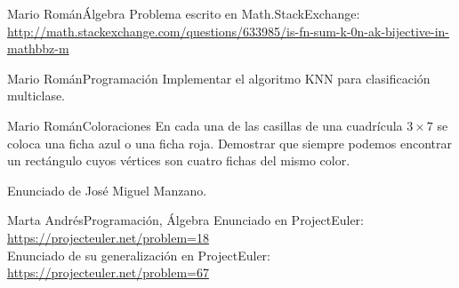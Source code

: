 \documentclass[a4paper, 11pt]{article} %
\numberwithin{prbcounter}{section}
\begin{document}
  
  \begin{enunciado}{Mario Román}{Álgebra}
    Problema escrito en Math.StackExchange:
    \url{http://math.stackexchange.com/questions/633985/is-fn-sum-k-0n-ak-bijective-in-mathbbz-m}
  \end{enunciado}

  \begin{enunciado}{Mario Román}{Programación}
    Implementar el algoritmo KNN para clasificación multiclase.
  \end{enunciado}

  \begin{enunciado}{Mario Román}{Coloraciones}
   En cada una de las casillas de una cuadrícula $3 \times 7$ se coloca una ficha azul o una ficha roja.
   Demostrar que siempre podemos encontrar un rectángulo cuyos vértices son cuatro fichas del mismo
   color.
   
   Enunciado de José Miguel Manzano. 
  \end{enunciado}

  \begin{enunciado}{Marta Andrés}{Programación, Álgebra}
   Enunciado en ProjectEuler: \url{https://projecteuler.net/problem=18} \\
   Enunciado de su generalización en ProjectEuler: \url{https://projecteuler.net/problem=67}
  \end{enunciado}

  
\end{document}
